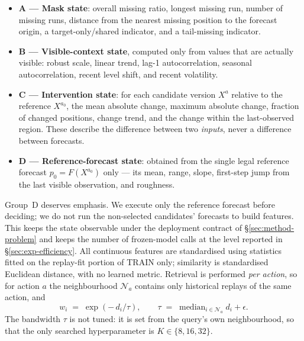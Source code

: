 \documentclass{article}
\newcommand{\calN}{\mathcal{N}}
\begin{document}
\begin{itemize}\itemsep1pt
  \item \textbf{A --- Mask state}: overall missing ratio, longest missing run, number of
  missing runs, distance from the nearest missing position to the forecast origin, a
  target-only/shared indicator, and a tail-missing indicator.
  \item \textbf{B --- Visible-context state}, computed only from values that are actually
  visible: robust scale, linear trend, lag-1 autocorrelation, seasonal autocorrelation,
  recent level shift, and recent volatility.
  \item \textbf{C --- Intervention state}: for each candidate version $X^{a}$ relative to
  the reference $X^{a_0}$, the mean absolute change, maximum absolute change, fraction of
  changed positions, change trend, and the change within the last-observed region. These
  describe the difference between two \emph{inputs}, never a difference between forecasts.
  \item \textbf{D --- Reference-forecast state}: obtained from the single legal reference
  forecast $p_0 = F(X^{a_0})$ only --- its mean, range, slope, first-step jump from the
  last visible observation, and roughness.
\end{itemize}

Group~D deserves emphasis. We execute only the reference forecast before deciding; we do
not run the non-selected candidates' forecasts to build features. This keeps the state
observable under the deployment contract of \S\ref{sec:method-problem} and keeps the
number of frozen-model calls at the level reported in \S\ref{sec:exp-efficiency}. All
continuous features are standardised using statistics fitted on the replay-fit portion of
TRAIN only; similarity is standardised Euclidean distance, with no learned metric.
Retrieval is performed \emph{per action}, so for action $a$ the neighbourhood $\calN_a$
contains only historical replays of the same action, and
\begin{equation}
  w_i \;=\; \exp\!\left(-\,d_i / \tau\right), \qquad
  \tau \;=\; \operatorname{median}_{i \in \calN_a} d_i + \epsilon .
  \label{eq:weights}
\end{equation}
The bandwidth $\tau$ is not tuned: it is set from the query's own neighbourhood, so that
the only searched hyperparameter is $K \in \{8, 16, 32\}$.
\end{document}
